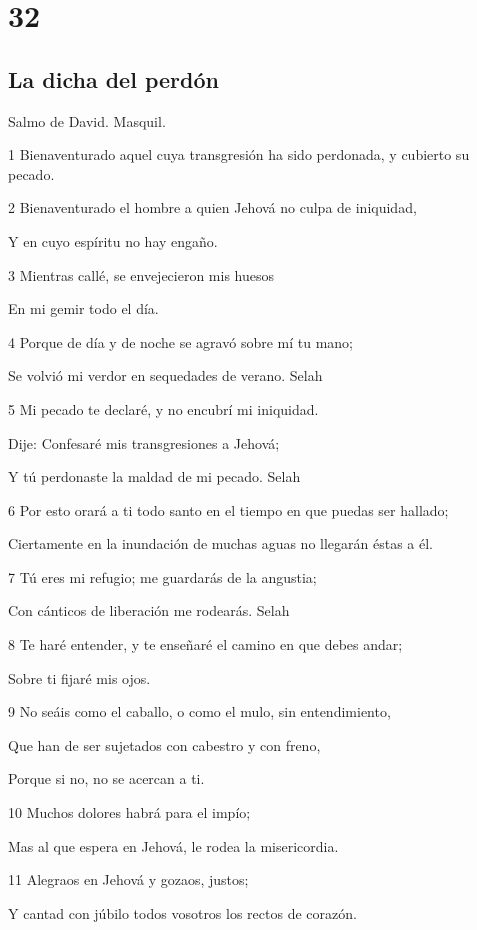 \chapter{32}

\section*{La dicha del perdón}

\par Salmo de David. Masquil.

\par 1 Bienaventurado aquel cuya transgresión ha sido perdonada, y cubierto su pecado.
\par 2 Bienaventurado el hombre a quien Jehová no culpa de iniquidad,
\par Y en cuyo espíritu no hay engaño.
\par 3 Mientras callé, se envejecieron mis huesos
\par En mi gemir todo el día.
\par 4 Porque de día y de noche se agravó sobre mí tu mano;
\par Se volvió mi verdor en sequedades de verano. Selah
\par 5 Mi pecado te declaré, y no encubrí mi iniquidad.
\par Dije: Confesaré mis transgresiones a Jehová;
\par Y tú perdonaste la maldad de mi pecado.  Selah
\par 6 Por esto orará a ti todo santo en el tiempo en que puedas ser hallado;
\par Ciertamente en la inundación de muchas aguas no llegarán éstas a él.
\par 7 Tú eres mi refugio; me guardarás de la angustia;
\par Con cánticos de liberación me rodearás. Selah
\par 8 Te haré entender, y te enseñaré el camino en que debes andar;
\par Sobre ti fijaré mis ojos.
\par 9 No seáis como el caballo, o como el mulo, sin entendimiento,
\par Que han de ser sujetados con cabestro y con freno,
\par Porque si no, no se acercan a ti.
\par 10 Muchos dolores habrá para el impío;
\par Mas al que espera en Jehová, le rodea la misericordia.
\par 11 Alegraos en Jehová y gozaos, justos;
\par Y cantad con júbilo todos vosotros los rectos de corazón.

